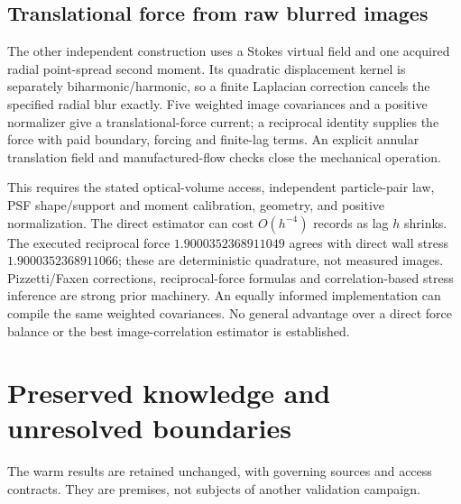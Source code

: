 \documentclass[11pt]{article}
\begin{document}
\subsection{Translational force from raw blurred images}
The other independent construction uses a Stokes virtual field and one acquired
radial point-spread second moment. Its quadratic displacement kernel is
separately biharmonic/harmonic, so a finite Laplacian correction cancels the
specified radial blur exactly. Five weighted image covariances and a positive
normalizer give a translational-force current; a reciprocal identity supplies
the force with paid boundary, forcing and finite-lag terms. An explicit annular
translation field and manufactured-flow checks close the mechanical operation.

This requires the stated optical-volume access, independent particle-pair law,
PSF shape/support and moment calibration, geometry, and positive normalization.
The direct estimator can cost $O(h^{-4})$ records as lag $h$ shrinks. The
executed reciprocal force $1.9000352368911049$ agrees with direct wall stress
$1.9000352368911066$; these are deterministic quadrature, not measured images.
Pizzetti/Faxen corrections, reciprocal-force formulas and correlation-based
stress inference are strong prior machinery. An equally informed implementation
can compile the same weighted covariances. No general advantage over a direct
force balance or the best image-correlation estimator is established.

\section{Preserved knowledge and unresolved boundaries}
The warm results are retained unchanged, with governing sources and access
contracts. They are premises, not subjects of another validation campaign.
\end{document}
